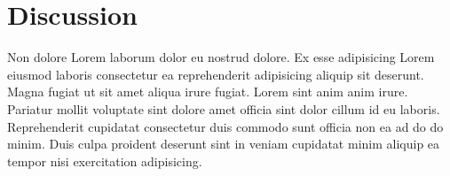
\chapter{Discussion}\label{ch:discussion}

Non dolore Lorem laborum dolor eu nostrud dolore. Ex esse adipisicing Lorem eiusmod laboris consectetur ea reprehenderit adipisicing aliquip sit deserunt. Magna fugiat ut sit amet aliqua irure fugiat. Lorem sint anim anim irure. Pariatur mollit voluptate sint dolore amet officia sint dolor cillum id eu laboris. Reprehenderit cupidatat consectetur duis commodo sunt officia non ea ad do do minim. Duis culpa proident deserunt sint in veniam cupidatat minim aliquip ea tempor nisi exercitation adipisicing.
